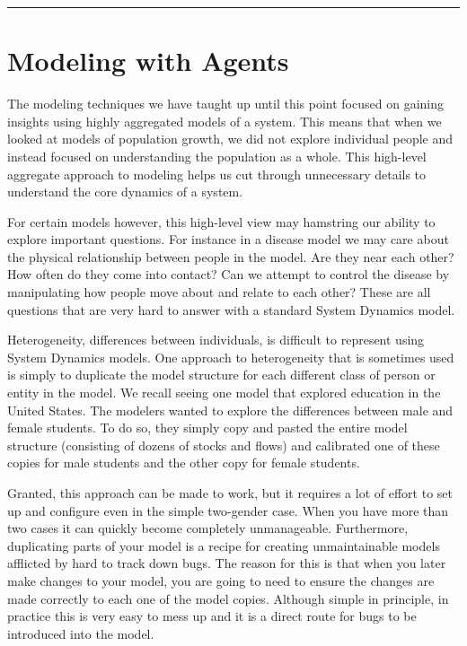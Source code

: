\documentclass[]{memoir}
\begin{document}
\begin{center}\rule{3in}{0.4pt}\end{center}

\chapter{Modeling with Agents}

The modeling techniques we have taught up until this point focused on
gaining insights using highly aggregated models of a system. This means
that when we looked at models of population growth, we did not explore
individual people and instead focused on understanding the population as
a whole. This high-level aggregate approach to modeling helps us cut
through unnecessary details to understand the core dynamics of a system.

For certain models however, this high-level view may hamstring our
ability to explore important questions. For instance in a disease model
we may care about the physical relationship between people in the model.
Are they near each other? How often do they come into contact? Can we
attempt to control the disease by manipulating how people move about and
relate to each other? These are all questions that are very hard to
answer with a standard System Dynamics model.

Heterogeneity, differences between individuals, is difficult to
represent using System Dynamics models. One approach to heterogeneity
that is sometimes used is simply to duplicate the model structure for
each different class of person or entity in the model. We recall seeing
one model that explored education in the United States. The modelers
wanted to explore the differences between male and female students. To
do so, they simply copy and pasted the entire model structure
(consisting of dozens of stocks and flows) and calibrated one of these
copies for male students and the other copy for female students.

Granted, this approach can be made to work, but it requires a lot of
effort to set up and configure even in the simple two-gender case. When
you have more than two cases it can quickly become completely
unmanageable. Furthermore, duplicating parts of your model is a recipe
for creating unmaintainable models afflicted by hard to track down bugs.
The reason for this is that when you later make changes to your model,
you are going to need to ensure the changes are made correctly to each
one of the model copies. Although simple in principle, in practice this
is very easy to mess up and it is a direct route for bugs to be
introduced into the model.
\end{document}
